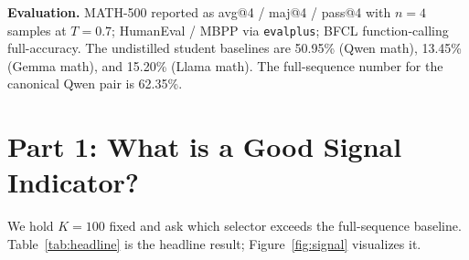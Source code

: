 \documentclass[10pt]{article}
\begin{document}
\textbf{Evaluation.} MATH-500 \citep{lightman2023verify,hendrycks2021measuring} reported as avg@4 / maj@4 / pass@4 with $n=4$ samples at $T=0.7$; HumanEval / MBPP \citep{chen2021evaluating,austin2021program} via \texttt{evalplus}; BFCL function-calling full-accuracy. The undistilled student baselines are 50.95\% (Qwen math), 13.45\% (Gemma math), and 15.20\% (Llama math). The full-sequence number for the canonical Qwen pair is 62.35\%.


\section{Part 1: What is a Good Signal Indicator?}
\label{sec:part1}

We hold $K=100$ fixed and ask which selector exceeds the full-sequence baseline. Table~\ref{tab:headline} is the headline result; Figure~\ref{fig:signal} visualizes it.
\end{document}
